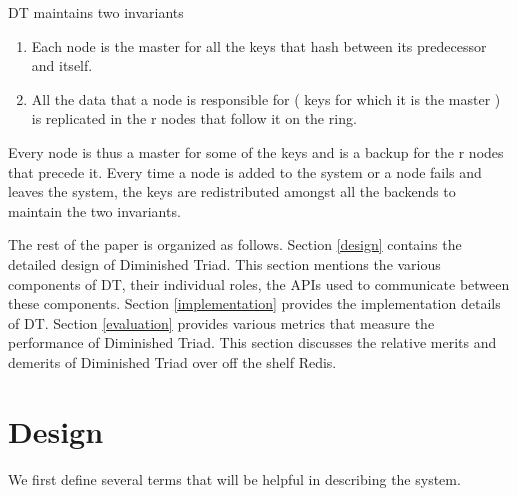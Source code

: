 \documentclass[10pt,twocolumn,letterpaper]{article}
\begin{document}
DT maintains two invariants
\begin{enumerate}
  \item Each node is the master for all the keys that hash between its predecessor and itself.
  \item All the data that a node is responsible for ( keys for which it is the master ) is replicated in the r nodes that follow it on the ring.
\end{enumerate}
Every node is thus a master for some of the keys and is a backup for the r nodes that precede it. Every time a node is added to the system or a node fails and leaves the system, the keys are redistributed amongst all the backends to maintain the two invariants.

The rest of the paper is organized as follows. Section \ref{design} contains the detailed design of Diminished Triad. This section mentions the various components of DT, their individual roles, the APIs used to communicate between these components. Section \ref{implementation} provides the implementation details of DT. Section \ref{evaluation} provides various metrics that measure the performance of Diminished Triad. This section discusses the relative merits and demerits of Diminished Triad over off the shelf Redis.

\section{Design} \label{Design}
We first define several terms that will be helpful in describing the system. 
\end{document}
